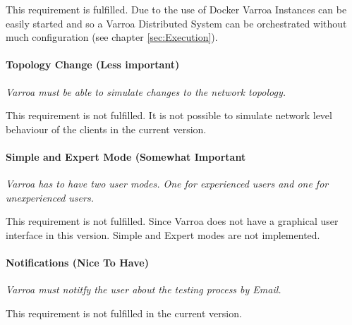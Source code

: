 This requirement is fulfilled. Due to the use of Docker Varroa Instances can be easily started and so a Varroa Distributed System can be orchestrated without much configuration (see chapter \ref{sec:Execution}).

\paragraph{Topology Change (Less important)}
\emph{Varroa must be able to simulate changes to the network topology.}

This requirement is not fulfilled.
It is not possible to simulate network level behaviour of the clients in the current version.

\paragraph{Simple and Expert Mode (Somewhat Important}
\emph{Varroa has to have two user modes.
One for experienced users and one for unexperienced users.}

This requirement is not fulfilled.
Since Varroa does not have a graphical user interface in this version.
Simple and Expert modes are not implemented.


\paragraph{Notifications (Nice To Have)}
\emph{Varroa must notitfy the user about the testing process by Email.}

This requirement is not fulfilled in the current version.